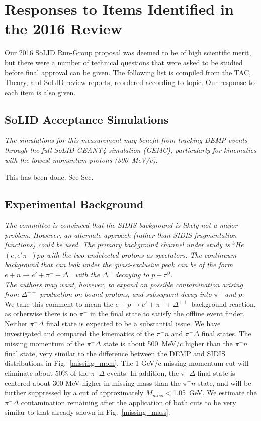 \section{Responses to Items Identified in the 2016 Review}

Our 2016 SoLID Run-Group proposal was deemed to be of high scientific merit,
but there were a number of technical questions that were asked to be studied
before final approval can be given.  The following list is compiled from the
TAC, Theory, and SoLID review reports, reordered according to topic.  Our 
response to each item is also given.

\subsection{SoLID Acceptance Simulations}

{\it The simulations for this measurement may benefit from tracking DEMP
  events through the full SoLID GEANT4 simulation (GEMC), particularly for
  kinematics with the lowest momentum protons (300~MeV/c).}

This has been done.  See Sec.

\subsection{Experimental Background}

{\it The committee is convinced that the SIDIS background is likely not a
  major problem.  However, an alternate approach (rather than SIDIS
  fragmentation functions) could be used.  The primary background channel under
  study is $^3$He$(e,e'\pi^-)pp$ with the two undetected protons as
  spectators.  The continuum background that can leak under the quasi-exclusive
  peak can be of the form $e+n\rightarrow e'+\pi^-+\Delta^+$ with the
  $\Delta^+$ decaying to $p+\pi^0$.}\\[0.2ex]

{\it The authors may want, however, to expand on possible contamination arising
  from $\Delta^{++}$ production on bound protons, and subsequent decay into
  $\pi^+$ and $p$.}\\
We take this comment to mean the $e+p\rightarrow e'+\pi^-+\Delta^{++}$
background reaction, as otherwise there is no $\pi^-$ in the final state to
satisfy the offline event finder.\\[0.2ex]

Neither $\pi^-\Delta$ final state is expected to be a substantial issue.  We
have investigated and compared the kinematics of the $\pi^-n$ and $\pi^-\Delta$
final states.  The missing momentum of the $\pi^-\Delta$ state is about
500~MeV/c higher than the $\pi^-n$ final state, very similar to the difference
between the DEMP and SIDIS distributions in Fig.~\ref{missing_mom}.  The 1
GeV/c missing momentum cut will eliminate about 50\% of the $\pi^-\Delta$
events.  In addition, the $\pi^-\Delta$ final state is centered about 300 MeV
higher in missing mass than the $\pi^-n$ state, and will be further suppressed
by a cut of approximately $M_{miss}<$1.05~GeV.  We estimate the $\pi^-\Delta$
contamination remaining after the application of both cuts to be very similar
to that already shown in Fig.~\ref{missing_mass}.

